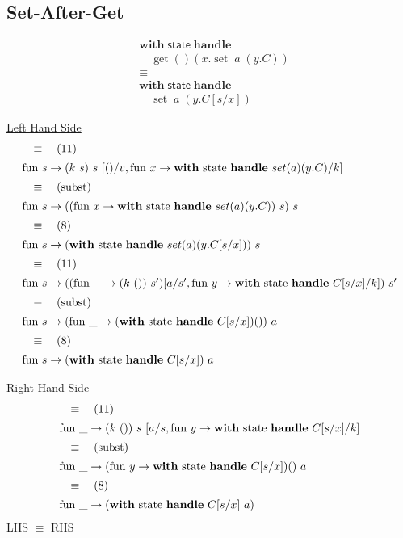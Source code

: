 \documentclass[logo,bsc,singlespacing,parskip]{infthesis}
\begin{document}
\subsection*{Set-After-Get}

\[
\begin{aligned}
    &\mathsf{\textbf{with}} \; \mathsf{state} \; \mathsf{\textbf{handle}} \\
    &\quad \operatorname{get}() \left( x. \operatorname{set} \; a \; (y. C) \right) \\
    &\equiv \\
    &\mathsf{\textbf{with}} \; \mathsf{state} \; \mathsf{\textbf{handle}} \\
    &\quad \operatorname{set} \; a \; (y. C[s/x])
\end{aligned}
\]

\underline{Left Hand Side}
\[ 
\begin{array}{l}
\quad\equiv\quad (11) \\[5pt]
\text{fun } s \rightarrow (k\ s)\ s\ [()/v, \text{fun } x \rightarrow \text{\textbf{with} state \textbf{handle} } set(a)(y.C)/k] \\[5pt]
\quad\equiv\quad (\text{subst}) \\[5pt]
\text{fun } s \rightarrow ((\text{fun } x \rightarrow \text{\textbf{with} state \textbf{handle} } set(a)(y.C))\ s)\ s \\[5pt]
\quad\equiv\quad (8) \\[5pt]
\text{fun } s \rightarrow (\text{\textbf{with} state \textbf{handle} } set(a)(y.C[s/x]))\ s \\[5pt]
\quad\equiv\quad (11) \\[5pt]
\text{fun } s \rightarrow ((\text{fun } \_ \rightarrow (k\ ())\ s')[a/s', \text{fun } y \rightarrow \text{\textbf{with} state \textbf{handle} } C[s/x]/k])\ s' \\[5pt]
\quad\equiv\quad (\text{subst}) \\[5pt]
\text{fun } s \rightarrow (\text{fun } \_ \rightarrow (\text{\textbf{with} state \textbf{handle} } C[s/x]) ())\ a \\[5pt]
\quad\equiv\quad (8) \\[5pt]
\text{fun } s \rightarrow (\text{\textbf{with} state \textbf{handle} } C[s/x])\ a
\end{array}
\]


\underline{Right Hand Side}
\[ 
\begin{array}{l}
\quad\equiv\quad (11) \\[5pt]
\text{fun }\_ \rightarrow (k\ ())\ s\ [a/s, \text{fun } y \rightarrow \text{\textbf{with} state \textbf{handle} } C[s/x]/k] \\[5pt]
\quad\equiv\quad (\text{subst}) \\[5pt]
\text{fun }\_ \rightarrow (\text{fun } y \rightarrow \text{\textbf{with} state \textbf{handle} } C[s/x]) ()\ a \\[5pt]
\quad\equiv\quad (8) \\[5pt]
\text{fun }\_ \rightarrow (\text{\textbf{with} state \textbf{handle} } C[s/x]\ a)
\end{array}
\]
LHS $\equiv$ RHS
\end{document}
